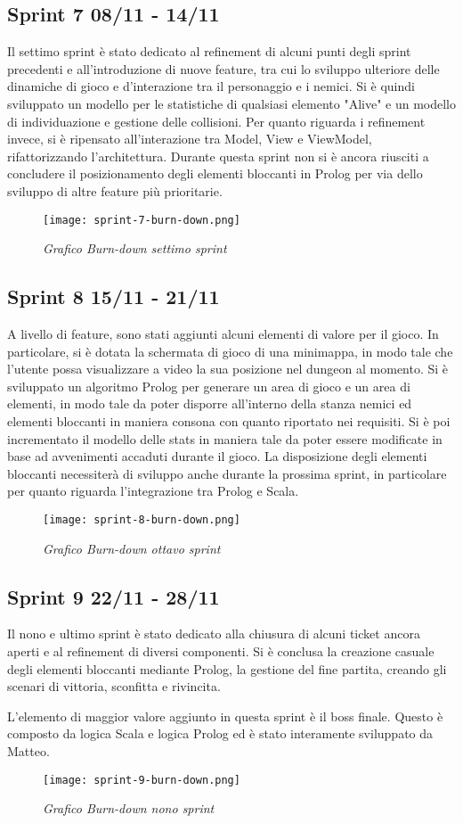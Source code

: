 \subsection{Sprint 7 08/11 - 14/11}
Il settimo sprint è stato dedicato al refinement di alcuni punti degli sprint precedenti e all'introduzione di nuove feature, tra cui lo sviluppo ulteriore delle dinamiche di gioco e d'interazione tra il personaggio e i nemici. 
Si è quindi sviluppato un modello per le statistiche di qualsiasi elemento "Alive" e un modello di individuazione e gestione delle collisioni. 
Per quanto riguarda i refinement invece, si è ripensato all'interazione tra Model, View e ViewModel, rifattorizzando l'architettura. 
Durante questa sprint non si è ancora riusciti a concludere il posizionamento degli elementi bloccanti in Prolog per via dello sviluppo di altre feature più prioritarie.
\begin{figure}[!hbt]
    \centering
    \texttt{[image: sprint-7-burn-down.png]}
    \caption{\textit{Grafico Burn-down settimo sprint}} 
\end{figure}


\subsection{Sprint 8 15/11 - 21/11}
A livello di feature, sono stati aggiunti alcuni elementi di valore per il gioco. 
In particolare, si è dotata la schermata di gioco di una minimappa, in modo tale che l'utente possa visualizzare a video la sua posizione nel dungeon al momento. 
Si è sviluppato un algoritmo Prolog per generare un area di gioco e un area di elementi, 
in modo tale da poter disporre all'interno della stanza nemici ed elementi bloccanti in maniera consona con quanto riportato nei requisiti.
Si è poi incrementato il modello delle stats in maniera tale da poter essere modificate in base ad avvenimenti accaduti durante il gioco. 
La disposizione degli elementi bloccanti necessiterà di sviluppo anche durante la prossima sprint, in particolare per quanto riguarda l'integrazione tra Prolog e Scala. 
\begin{figure}[!hbt]
    \centering
    \texttt{[image: sprint-8-burn-down.png]}
    \caption{\textit{Grafico Burn-down ottavo sprint}} 
\end{figure}

\subsection{Sprint 9 22/11 - 28/11}
Il nono e ultimo sprint è stato dedicato alla chiusura di alcuni ticket ancora aperti e al refinement di diversi componenti. 
Si è conclusa la creazione casuale degli elementi bloccanti mediante Prolog, la gestione del fine partita, creando gli scenari di vittoria, sconfitta e rivincita.

L'elemento di maggior valore aggiunto in questa sprint è il boss finale. Questo è composto da logica Scala e logica Prolog ed è stato interamente sviluppato da Matteo. 

\begin{figure}[!hbt]
    \centering
    \texttt{[image: sprint-9-burn-down.png]}
    \caption{\textit{Grafico Burn-down nono sprint}} 
\end{figure}
